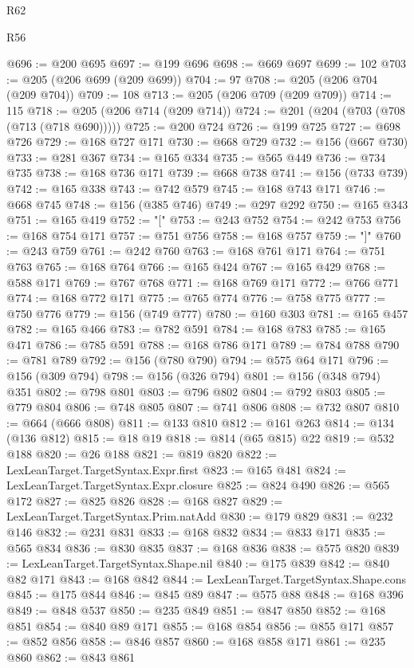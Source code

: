 \begin{lexlean}{R62}
\begin{lexlean}{R56}
\begin{coremodule}
{{{{{{{{{{{{{{{{{{{{{{{{{{{{{{{{{{{{{{{{{{{{{{{{{{{{{{{{{{{{{{{{{{{{{{{{{{{{{{{{{{{{{{{{{{{{{{{{{{{{{{{{{{{{{{{{{{{{{{{{{{{{{{{{{{{{{{{{{{{{{{{{{{{{{{{{{{{{{{{{{{{{{{{{{{{{{{{{{{{{{{{{{{{{{{{{{{{{{{{{{{{{{{{{{{{@696 := @200 @695
@697 := @199 @696
@698 := @669 @697
@699 := 102
@703 := @205 (@206 @699 (@209 @699))
@704 := 97
@708 := @205 (@206 @704 (@209 @704))
@709 := 108
@713 := @205 (@206 @709 (@209 @709))
@714 := 115
@718 := @205 (@206 @714 (@209 @714))
@724 := @201 (@204 (@703 (@708 (@713 (@718 @690)))))
@725 := @200 @724
@726 := @199 @725
@727 := @698 @726
@729 := @168 @727 @171
@730 := @668 @729
@732 := @156 (@667 @730)
@733 := @281 @367
@734 := @165 @334
@735 := @565 @449
@736 := @734 @735
@738 := @168 @736 @171
@739 := @668 @738
@741 := @156 (@733 @739)
@742 := @165 @338
@743 := @742 @579
@745 := @168 @743 @171
@746 := @668 @745
@748 := @156 (@385 @746)
@749 := @297 @292
@750 := @165 @343
@751 := @165 @419
@752 := "["
@753 := @243 @752
@754 := @242 @753
@756 := @168 @754 @171
@757 := @751 @756
@758 := @168 @757
@759 := "]"
@760 := @243 @759
@761 := @242 @760
@763 := @168 @761 @171
@764 := @751 @763
@765 := @168 @764
@766 := @165 @424
@767 := @165 @429
@768 := @588 @171
@769 := @767 @768
@771 := @168 @769 @171
@772 := @766 @771
@774 := @168 @772 @171
@775 := @765 @774
@776 := @758 @775
@777 := @750 @776
@779 := @156 (@749 @777)
@780 := @160 @303
@781 := @165 @457
@782 := @165 @466
@783 := @782 @591
@784 := @168 @783
@785 := @165 @471
@786 := @785 @591
@788 := @168 @786 @171
@789 := @784 @788
@790 := @781 @789
@792 := @156 (@780 @790)
@794 := @575 @64 @171
@796 := @156 (@309 @794)
@798 := @156 (@326 @794)
@801 := @156 (@348 @794) @351
@802 := @798 @801
@803 := @796 @802
@804 := @792 @803
@805 := @779 @804
@806 := @748 @805
@807 := @741 @806
@808 := @732 @807
@810 := @664 (@666 @808)
@811 := @133 @810
@812 := @161 @263
@814 := @134 (@136 @812)
@815 := @18 @19
@818 := @814 (@65 @815) @22
@819 := @532 @188
@820 := @26 @188
@821 := @819 @820
@822 := LexLeanTarget.TargetSyntax.Expr.first
@823 := @165 @481
@824 := LexLeanTarget.TargetSyntax.Expr.closure
@825 := @824 @490
@826 := @565 @172
@827 := @825 @826
@828 := @168 @827
@829 := LexLeanTarget.TargetSyntax.Prim.natAdd
@830 := @179 @829
@831 := @232 @146
@832 := @231 @831
@833 := @168 @832
@834 := @833 @171
@835 := @565 @834
@836 := @830 @835
@837 := @168 @836
@838 := @575 @820
@839 := LexLeanTarget.TargetSyntax.Shape.nil
@840 := @175 @839
@842 := @840 @82 @171
@843 := @168 @842
@844 := LexLeanTarget.TargetSyntax.Shape.cons
@845 := @175 @844
@846 := @845 @89
@847 := @575 @88
@848 := @168 @396
@849 := @848 @537
@850 := @235 @849
@851 := @847 @850
@852 := @168 @851
@854 := @840 @89 @171
@855 := @168 @854
@856 := @855 @171
@857 := @852 @856
@858 := @846 @857
@860 := @168 @858 @171
@861 := @235 @860
@862 := @843 @861
}}}}}}}}}}}}}}}}}}}}}}}}}}}}}}}}}}}}}}}}}}}}}}}}}}}}}}}}}}}}}}}}}}}}}}}}}}}}}}}}}}}}}}}}}}}}}}}}}}}}}}}}}}}}}}}}}}}}}}}}}}}}}}}}}}}}}}}}}}}}}}}}}}}}}}}}}}}}}}}}}}}}}}}}}}}}}}}}}}}}}}}}}}}}}}}}}}}}}}}}}}}}}}}}}}}
\end{coremodule}
\end{lexlean}
\end{lexlean}
